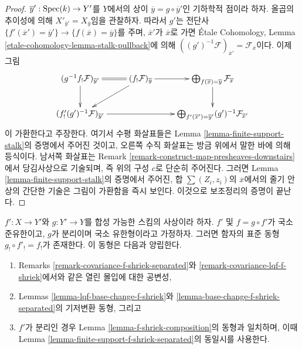 \begin{proof}
\medskip\noindent
$\overline{y}' : \mathop{\mathrm{Spec}}(k) \to Y'$를 $Y$에서의 상이
$\overline{y} = g \circ \overline{y}'$인 기하학적 점이라 하자.
올곱의 추이성에 의해 $X'_{\overline{y}'} = X_{\overline{y}}$임을
관찰하자. 따라서 $g'$는 전단사
$\{f'(\overline{x}') = \overline{y}'\} \to
\{f(\overline{x}) = \overline{y}\}$를 주며,
$\overline{x}'$가 $\overline{x}$로 가면 \'Etale Cohomology, Lemma
\ref{etale-cohomology-lemma-stalk-pullback}에 의해
$((g')^{-1}\mathcal{F})_{\overline{x}'} = \mathcal{F}_{\overline{x}}$이다.
이제 그림
$$
\xymatrix{
(g^{-1}f_!\mathcal{F})_{\overline{y}'} \ar@{=}[r] \ar[d] &
(f_!\mathcal{F})_{\overline{y}} \ar[r] \ar[ld] &
\bigoplus\nolimits_{f(\overline{x}) = \overline{y}}
\mathcal{F}_{\overline{x}} \ar[d]
\\
(f'_!(g')^{-1}\mathcal{F})_{\overline{y}'} \ar[rr] & &
\bigoplus\nolimits_{f'(\overline{x}') = \overline{y}'}
(g')^{-1}\mathcal{F}_{\overline{x}'}
}
$$
이 가환한다고 주장한다. 여기서 수평 화살표들은 Lemma
\ref{lemma-finite-support-stalk}의 증명에서 주어진 것이고, 오른쪽
수직 화살표는 방금 위에서 말한 바에 의해 등식이다. 남서쪽 화살표는
Remark \ref{remark-construct-map-presheaves-downstairs}에서 당김사상으로
기술되며, 즉 위의 구성 $c$로 단순히 주어진다. 그러면 Lemma
\ref{lemma-finite-support-stalk}의 증명에서 주어진, 합
$\sum (Z_i, z_i)$의 $\overline{x}$에서의 줄기 안 상의 간단한 기술은
그림이 가환함을 즉시 보인다. 이것으로 보조정리의 증명이 끝난다.
\end{proof}

\begin{lemma}
\label{lemma-lqf-separated-shriek-composition}
$f' : X \to Y'$와 $g : Y' \to Y$를 합성 가능한 스킴의 사상이라 하자.
$f'$ 및 $f = g \circ f'$가 국소 준유한이고, $g$가 분리이며 국소
유한형이라고 가정하자. 그러면 함자의 표준 동형
$g_! \circ f'_! = f_!$가 존재한다. 이 동형은 다음과 양립한다.
\begin{enumerate}
\item[(a)] Remarks \ref{remark-covariance-f-shriek-separated}와
\ref{remark-covariance-lqf-f-shriek}에서와 같은 열린 몰입에 대한 공변성,
\item[(b)] Lemmas \ref{lemma-lqf-base-change-f-shriek}와
\ref{lemma-base-change-f-shriek-separated}의 기저변환 동형, 그리고
\item[(c)] $f'$가 분리인 경우 Lemma
\ref{lemma-f-shriek-composition}의 동형과 일치하며, 이때 Lemma
\ref{lemma-finite-support-f-shriek-separated}의 동일시를 사용한다.
\end{enumerate}
\end{lemma}

